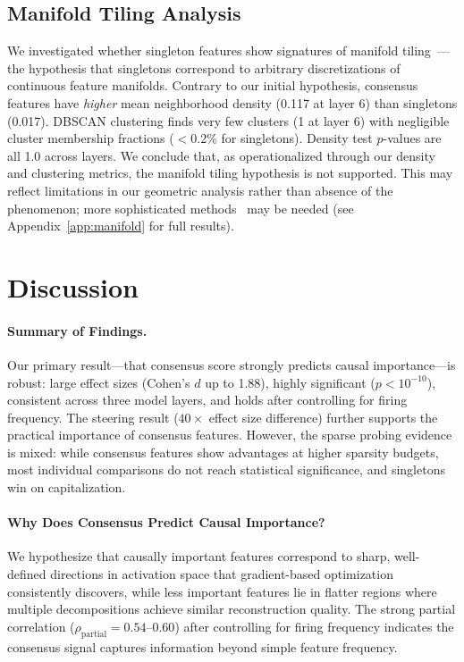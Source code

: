 \documentclass{article}
\begin{document}
\subsection{Manifold Tiling Analysis}
\label{sec:manifold}

We investigated whether singleton features show signatures of manifold tiling~\citep{michaud2025understanding}---the hypothesis that singletons correspond to arbitrary discretizations of continuous feature manifolds. Contrary to our initial hypothesis, consensus features have \emph{higher} mean neighborhood density (0.117 at layer 6) than singletons (0.017). DBSCAN clustering finds very few clusters (1 at layer 6) with negligible cluster membership fractions ($<$0.2\% for singletons). Density test $p$-values are all 1.0 across layers. We conclude that, as operationalized through our density and clustering metrics, the manifold tiling hypothesis is not supported. This may reflect limitations in our geometric analysis rather than absence of the phenomenon; more sophisticated methods~\citep{li2025geometry} may be needed (see Appendix~\ref{app:manifold} for full results).

\section{Discussion}
\label{sec:discussion}

\paragraph{Summary of Findings.}
Our primary result---that consensus score strongly predicts causal importance---is robust: large effect sizes (Cohen's $d$ up to 1.88), highly significant ($p < 10^{-10}$), consistent across three model layers, and holds after controlling for firing frequency. The steering result ($40\times$ effect size difference) further supports the practical importance of consensus features. However, the sparse probing evidence is mixed: while consensus features show advantages at higher sparsity budgets, most individual comparisons do not reach statistical significance, and singletons win on capitalization.

\paragraph{Why Does Consensus Predict Causal Importance?}
We hypothesize that causally important features correspond to sharp, well-defined directions in activation space that gradient-based optimization consistently discovers, while less important features lie in flatter regions where multiple decompositions achieve similar reconstruction quality. The strong partial correlation ($\rho_{\text{partial}} = 0.54$--$0.60$) after controlling for firing frequency indicates the consensus signal captures information beyond simple feature frequency.
\end{document}

